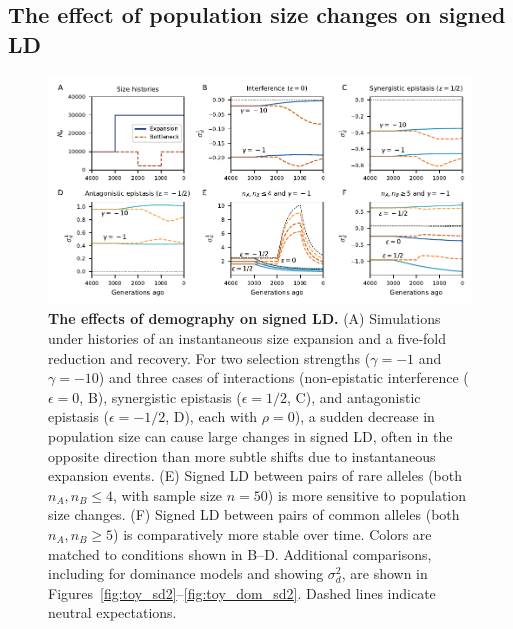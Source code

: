 \documentclass[]{article}
\begin{document}
\subsection{The effect of population size changes on signed LD}
\label{sec:demography}

\begin{figure}[tb!]
    \centering
    \includegraphics{../figures/demog_bottle_expand}
    \caption{
        \textbf{The effects of demography on signed LD.}
        (A) Simulations under histories of an instantaneous size expansion
        and a five-fold reduction and recovery.
        For two selection strengths (\(\gamma=-1\) and \(\gamma=-10\)) and three
        cases of interactions (non-epistatic interference (\(\epsilon=0\), B),
        synergistic epistasis (\(\epsilon=1/2\), C), and antagonistic epistasis
        (\(\epsilon=-1/2\), D), each with \(\rho=0\)), a
        sudden decrease in population size can cause
        large changes in signed LD, often in the opposite direction than more
        subtle shifts due to instantaneous expansion events.
        (E) Signed LD between pairs of rare alleles (both \(n_A, n_B \leq 4\), with
        sample size \(n=50\)) is more sensitive to population size changes.
        (F) Signed LD between pairs of common alleles (both \(n_A, n_B \geq 5\))
        is comparatively more stable over time.
        Colors are matched to conditions shown in B--D.
        Additional comparisons, including for dominance models and showing
        \(\sigma_d^2\), are shown in Figures~\ref{fig:toy_sd2}--\ref{fig:toy_dom_sd2}.
        Dashed lines indicate neutral expectations.
    }
    \label{fig:toy}
\end{figure}
\end{document}
